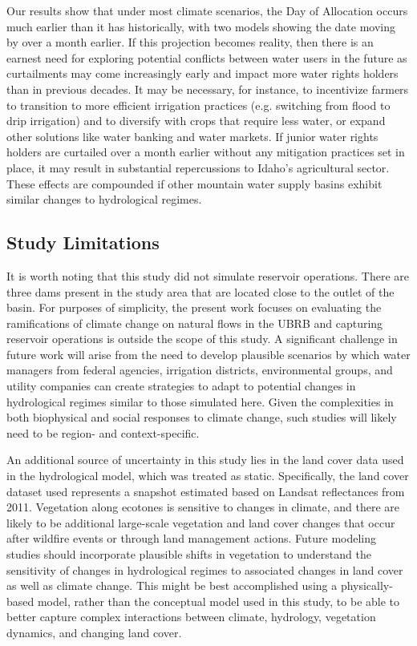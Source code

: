 \documentclass[water,article,submit,moreauthors,pdftex,10pt,a4paper]{mdpi}
\theoremstyle{mdpi}
\newcounter{ex}
\newcounter{re}
\theoremstyle{mdpidefinition}
\begin{document}
Our results show that under most climate scenarios, the Day of Allocation occurs much earlier than it has historically, with two models showing the date moving by over a month earlier. If this projection becomes reality, then there is an earnest need for exploring potential conflicts between water users in the future as curtailments may come increasingly early and impact more water rights holders than in previous decades. It may be necessary, for instance, to incentivize farmers to transition to more efficient irrigation practices (e.g. switching from flood to drip irrigation) and to diversify with crops that require less water, or expand other solutions like water banking and water markets. If junior water rights holders are curtailed over a month earlier without any mitigation practices set in place, it may result in substantial repercussions to Idaho’s agricultural sector. These effects are compounded if other mountain water supply basins exhibit similar changes to hydrological regimes. 

\subsection{Study Limitations}

It is worth noting that this study did not simulate reservoir operations. There are three dams present in the study area that are located close to the outlet of the basin. For purposes of simplicity, the present work focuses on evaluating the ramifications of climate change on natural flows in the UBRB and capturing reservoir operations is outside the scope of this study. A significant challenge in future work will arise from the need to develop plausible scenarios by which water managers from federal agencies, irrigation districts, environmental groups, and utility companies can create strategies to adapt to potential changes in hydrological regimes similar to those simulated here. Given the complexities in both biophysical and social responses to climate change, such studies will likely need to be region- and context-specific.  

An additional source of uncertainty in this study lies in the land cover data used in the hydrological model, which was treated as static. Specifically, the land cover dataset used represents a snapshot estimated based on Landsat reflectances from 2011. Vegetation along ecotones is sensitive to changes in climate, and there are likely to be additional large-scale vegetation and land cover changes that occur after wildfire events or through land management actions. Future modeling studies should incorporate plausible shifts in vegetation to understand the sensitivity of changes in hydrological regimes to associated changes in land cover as well as climate change. This might be best accomplished using a physically-based model, rather than the conceptual model used in this study, to be able to better capture complex interactions between climate, hydrology, vegetation dynamics, and changing land cover.
\end{document}
